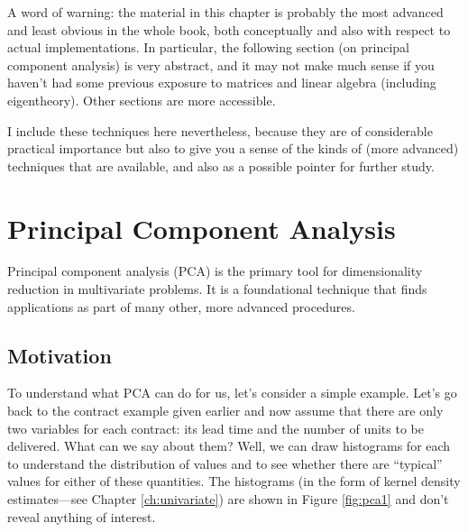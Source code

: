 A word of warning: the material in this chapter is probably the most
advanced and least obvious in the whole book, both conceptually and
also with respect to actual implementations. In particular, the
following section (on principal component analysis) is very abstract,
and it may not make much sense if you haven't had some previous
exposure to matrices and linear algebra (including eigentheory). Other
sections are more accessible.

I include these techniques here nevertheless, because they are of
considerable practical importance but also to give you a sense of the
kinds of (more advanced) techniques that are available, and also as a
possible pointer for further study.


\section{Principal Component Analysis}


Principal component analysis (PCA) is the primary tool for
dimensionality reduction in multivariate problems. It is a
foundational technique that finds applications as part of many other,
more advanced procedures.
\subsection{Motivation}

 
To understand what PCA can do for us, let's consider a simple example.
Let's go back to the contract example given earlier and now assume
that there are only two variables for each contract: its lead time and
the number of units to be delivered. What can we say about them? Well,
we can draw histograms for each to understand the distribution of
values and to see whether there are ``typical'' values for either of
these quantities. The histograms (in the form of kernel density
estimates---see Chapter \ref{ch:univariate}) are shown in Figure
\ref{fig:pca1} and don't reveal anything of interest.

